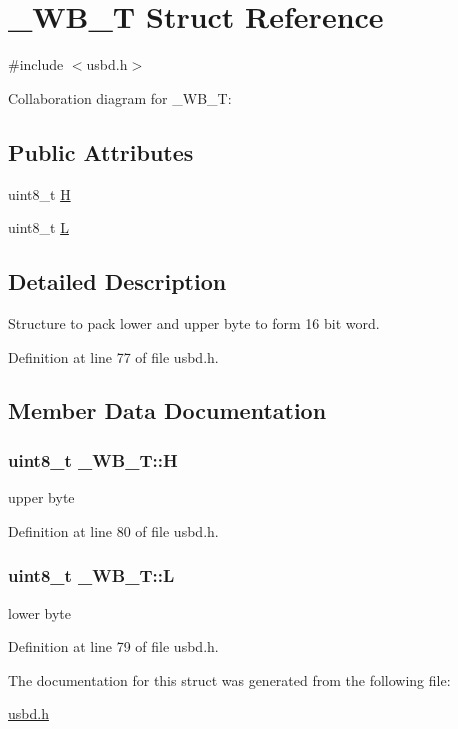 \hypertarget{struct__WB__T}{}\section{\+\_\+\+W\+B\+\_\+T Struct Reference}
\label{struct__WB__T}


{\ttfamily \#include $<$usbd.\+h$>$}



Collaboration diagram for \+\_\+\+W\+B\+\_\+T\+:
\subsection*{Public Attributes}
\begin{DoxyCompactItemize}
\item 
uint8\+\_\+t \hyperlink{struct__WB__T_af5f6d47d99f6e1c34cde41a71607d09d}{H}
\item 
uint8\+\_\+t \hyperlink{struct__WB__T_a29f33d98a209b8353b29f66cd48de5e8}{L}
\end{DoxyCompactItemize}


\subsection{Detailed Description}
Structure to pack lower and upper byte to form 16 bit word. 

Definition at line 77 of file usbd.\+h.



\subsection{Member Data Documentation}
\subsubsection[{\texorpdfstring{H}{H}}]{\setlength{\rightskip}{0pt plus 5cm}uint8\+\_\+t \+\_\+\+W\+B\+\_\+\+T\+::H}\hypertarget{struct__WB__T_af5f6d47d99f6e1c34cde41a71607d09d}{}\label{struct__WB__T_af5f6d47d99f6e1c34cde41a71607d09d}
upper byte 

Definition at line 80 of file usbd.\+h.

\subsubsection[{\texorpdfstring{L}{L}}]{\setlength{\rightskip}{0pt plus 5cm}uint8\+\_\+t \+\_\+\+W\+B\+\_\+\+T\+::L}\hypertarget{struct__WB__T_a29f33d98a209b8353b29f66cd48de5e8}{}\label{struct__WB__T_a29f33d98a209b8353b29f66cd48de5e8}
lower byte 

Definition at line 79 of file usbd.\+h.



The documentation for this struct was generated from the following file\+:\begin{DoxyCompactItemize}
\item 
\hyperlink{usbd_8h}{usbd.\+h}\end{DoxyCompactItemize}
